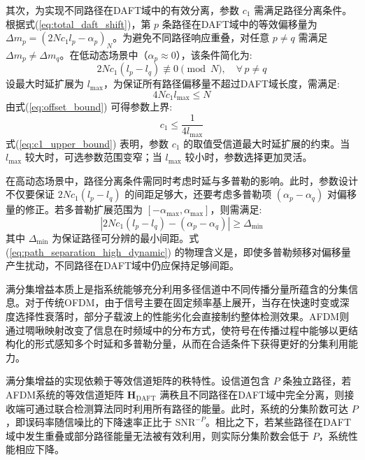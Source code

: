 其次，为实现不同路径在DAFT域中的有效分离，参数 $c_1$ 需满足路径分离条件。根据式(\ref{eq:total_daft_shift})，第 $p$ 条路径在DAFT域中的等效偏移量为 $\Delta m_p = (2Nc_1 l_p - \alpha_p)_N$。为避免不同路径响应重叠，对任意 $p \neq q$ 需满足 $\Delta m_p \neq \Delta m_q$。在低动态场景中（$\alpha_p \approx 0$），该条件简化为:
\begin{equation}
    2Nc_1(l_p - l_q) \not\equiv 0 \pmod{N}, \quad \forall\, p \neq q
    \label{eq:path_separation_low_dynamic}
\end{equation}
设最大时延扩展为 $l_{\max}$，为保证所有路径偏移量不超过DAFT域长度，需满足:
\begin{equation}
    4Nc_1 l_{\max} \leq N
    \label{eq:offset_bound}
\end{equation}
由式(\ref{eq:offset_bound}) 可得参数上界:
\begin{equation}
    c_1 \leq \frac{1}{4l_{\max}}
    \label{eq:c1_upper_bound}
\end{equation}
式(\ref{eq:c1_upper_bound}) 表明，参数 $c_1$ 的取值受信道最大时延扩展的约束。当 $l_{\max}$ 较大时，可选参数范围变窄；当 $l_{\max}$ 较小时，参数选择更加灵活。

在高动态场景中，路径分离条件需同时考虑时延与多普勒的影响。此时，参数设计不仅要保证 $2Nc_1(l_p - l_q)$ 的间距足够大，还要考虑多普勒项 $(\alpha_p - \alpha_q)$ 对偏移量的修正。若多普勒扩展范围为 $[-\alpha_{\max}, \alpha_{\max}]$，则需满足:
\begin{equation}
    |2Nc_1(l_p - l_q) - (\alpha_p - \alpha_q)| \geq \Delta_{\min}
    \label{eq:path_separation_high_dynamic}
\end{equation}
其中 $\Delta_{\min}$ 为保证路径可分辨的最小间距。式(\ref{eq:path_separation_high_dynamic}) 的物理含义是，即使多普勒频移对偏移量产生扰动，不同路径在DAFT域中仍应保持足够间距。


满分集增益本质上是指系统能够充分利用多径信道中不同传播分量所蕴含的分集信息。对于传统OFDM，由于信号主要在固定频率基上展开，当存在快速时变或深度选择性衰落时，部分子载波上的性能劣化会直接制约整体检测效果。AFDM则通过啁啾映射改变了信息在时频域中的分布方式，使符号在传播过程中能够以更结构化的形式感知多个时延和多普勒分量，从而在合适条件下获得更好的分集利用能力。

满分集增益的实现依赖于等效信道矩阵的秩特性。设信道包含 $P$ 条独立路径，若AFDM系统的等效信道矩阵 $\mathbf{H}_{\mathrm{DAFT}}$ 满秩且不同路径在DAFT域中完全分离，则接收端可通过联合检测算法同时利用所有路径的能量。此时，系统的分集阶数可达 $P$，即误码率随信噪比的下降速率正比于 $\mathrm{SNR}^{-P}$。相比之下，若某些路径在DAFT域中发生重叠或部分路径能量无法被有效利用，则实际分集阶数会低于 $P$，系统性能相应下降。

